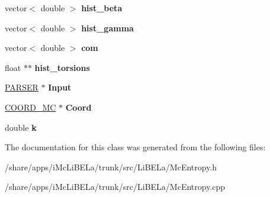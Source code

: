 \begin{DoxyCompactItemize}
\item 
\hypertarget{classMcEntropy_ac2babf7dfaf13de2a697d6de2509a69a}{
vector$<$ double $>$ {\bfseries hist\_\-beta}}
\label{classMcEntropy_ac2babf7dfaf13de2a697d6de2509a69a}

\item 
\hypertarget{classMcEntropy_ac89119e2776444781c93247c503558ef}{
vector$<$ double $>$ {\bfseries hist\_\-gamma}}
\label{classMcEntropy_ac89119e2776444781c93247c503558ef}

\item 
\hypertarget{classMcEntropy_a952d89418d03753bd0a49c8de983c550}{
vector$<$ double $>$ {\bfseries com}}
\label{classMcEntropy_a952d89418d03753bd0a49c8de983c550}

\item 
\hypertarget{classMcEntropy_ac15cca889dc032e44a997251f13ed426}{
float $\ast$$\ast$ {\bfseries hist\_\-torsions}}
\label{classMcEntropy_ac15cca889dc032e44a997251f13ed426}

\item 
\hypertarget{classMcEntropy_a849dfb9b7592383ec3d241f3bb162e52}{
\hyperlink{classPARSER}{PARSER} $\ast$ {\bfseries Input}}
\label{classMcEntropy_a849dfb9b7592383ec3d241f3bb162e52}

\item 
\hypertarget{classMcEntropy_a5936fa7d6cf66b5dd26a0b245b9bcc27}{
\hyperlink{classCOORD__MC}{COORD\_\-MC} $\ast$ {\bfseries Coord}}
\label{classMcEntropy_a5936fa7d6cf66b5dd26a0b245b9bcc27}

\item 
\hypertarget{classMcEntropy_a43e8372c7b0f0cd06777783d948f1042}{
double {\bfseries k}}
\label{classMcEntropy_a43e8372c7b0f0cd06777783d948f1042}

\end{DoxyCompactItemize}


The documentation for this class was generated from the following files:\begin{DoxyCompactItemize}
\item 
/share/apps/iMcLiBELa/trunk/src/LiBELa/McEntropy.h\item 
/share/apps/iMcLiBELa/trunk/src/LiBELa/McEntropy.cpp\end{DoxyCompactItemize}
